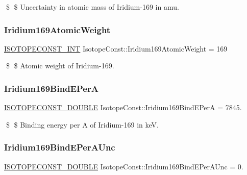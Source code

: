 \$ \$ Uncertainty in atomic mass of Iridium-\/169 in amu. \mbox{\label{group___isotope_const-_iridium-_ir169_ga96a23ceb1bc8034e385895eacaa54b19}} 
\subsubsection{\texorpdfstring{Iridium169\+Atomic\+Weight}{Iridium169AtomicWeight}}
{\footnotesize\ttfamily \mbox{\hyperlink{group___isotope_const-_macros_ga5f18360b3e99483a35c32d789e62621c}{I\+S\+O\+T\+O\+P\+E\+C\+O\+N\+S\+T\+\_\+\+I\+NT}} Isotope\+Const\+::\+Iridium169\+Atomic\+Weight = 169}

\$ \$ Atomic weight of Iridium-\/169. \mbox{\label{group___isotope_const-_iridium-_ir169_gae96bea751158f437c1a4c9b0c944ba78}} 
\subsubsection{\texorpdfstring{Iridium169\+Bind\+E\+PerA}{Iridium169BindEPerA}}
{\footnotesize\ttfamily \mbox{\hyperlink{group___isotope_const-_macros_ga8f45a7272ce02c0b4c65c44636ed719a}{I\+S\+O\+T\+O\+P\+E\+C\+O\+N\+S\+T\+\_\+\+D\+O\+U\+B\+LE}} Isotope\+Const\+::\+Iridium169\+Bind\+E\+PerA = 7845.}

\$ \$ Binding energy per A of Iridium-\/169 in keV. \mbox{\label{group___isotope_const-_iridium-_ir169_ga7d42b5187590361289ea813ad73378a5}} 
\subsubsection{\texorpdfstring{Iridium169\+Bind\+E\+Per\+A\+Unc}{Iridium169BindEPerAUnc}}
{\footnotesize\ttfamily \mbox{\hyperlink{group___isotope_const-_macros_ga8f45a7272ce02c0b4c65c44636ed719a}{I\+S\+O\+T\+O\+P\+E\+C\+O\+N\+S\+T\+\_\+\+D\+O\+U\+B\+LE}} Isotope\+Const\+::\+Iridium169\+Bind\+E\+Per\+A\+Unc = 0.}

